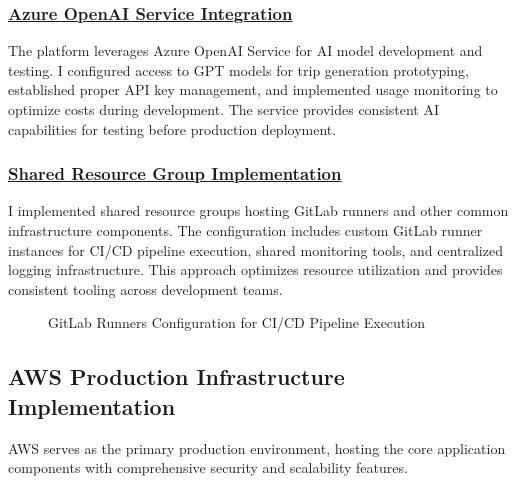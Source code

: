 \subsubsection*{\underline{Azure OpenAI Service Integration}}
The platform leverages Azure OpenAI Service for AI model development and testing. I configured access to GPT models for trip generation prototyping, established proper API key management, and implemented usage monitoring to optimize costs during development. The service provides consistent AI capabilities for testing before production deployment.

\subsubsection*{\underline{Shared Resource Group Implementation}}
I implemented shared resource groups hosting GitLab runners and other common infrastructure components. The configuration includes custom GitLab runner instances for CI/CD pipeline execution, shared monitoring tools, and centralized logging infrastructure. This approach optimizes resource utilization and provides consistent tooling across development teams.

\begin{figure}[H]
    \centering
    \caption{GitLab Runners Configuration for CI/CD Pipeline Execution}
    \label{fig:gitlab-runners-list}
\end{figure}

\subsection{AWS Production Infrastructure Implementation}
AWS serves as the primary production environment, hosting the core application components with comprehensive security and scalability features.

